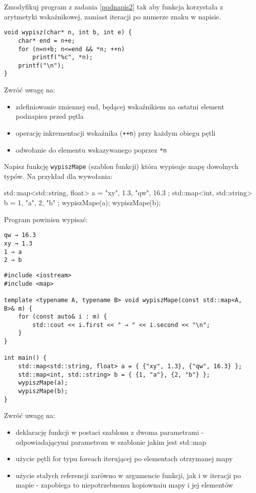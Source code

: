 \dbEntryCheckResults
Zmodyfikuj program z zadania \ref{podnapis2} tak aby funkcja korzystała z arytmetyki wskaźnikowej, zamiast iteracji po numerze znaku w napisie.
\fi

\dbEntryCheckResults
\begin{verbatim}
void wypisz(char* n, int b, int e) {
	char* end = n+e;
	for (n=n+b; n<=end && *n; ++n)
		printf("%c", *n);
	printf("\n");
}
\end{verbatim}

\noindent Zwróć uwagę na:
\begin{itemize}
\item zdefiniowanie zmiennej end, będącej wskaźnikiem na ostatni element podnapisu przed pętla
\item operację inkrementacji wskaźnika (\Verb$++n$) przy każdym obiegu pętli
\item odwołanie do elementu wskazywanego poprzez \Verb$*n$
\end{itemize}
\fi


\dbEntryCheckResults
Napisz funkcję \Verb#wypiszMape# (szablon funkcji) która wypisuje mapę dowolnych typów. Na przykład dla wywołania:
\begin{CodeFrame*}[cpp]{}
std::map<std::string, float> a = { {"xy", 1.3}, {"qw", 16.3} };
std::map<int, std::string> b = { {1, "a"}, {2, "b"} };
wypiszMape(a);
wypiszMape(b);
\end{CodeFrame*}
\vspace{-8pt}Program powinien wypisać:
\vspace{-8pt}\begin{Verbatim}
qw → 16.3
xy → 1.3
1 → a
2 → b
\end{Verbatim}
\fi

\dbEntryCheckResults
\begin{verbatim}
#include <iostream>
#include <map>

template <typename A, typename B> void wypiszMape(const std::map<A, B>& m) {
	for (const auto& i : m) {
		std::cout << i.first << " → " << i.second << "\n";
	}
}

int main() {
	std::map<std::string, float> a = { {"xy", 1.3}, {"qw", 16.3} };
	std::map<int, std::string> b = { {1, "a"}, {2, "b"} };
	wypiszMape(a);
	wypiszMape(b);
}
\end{verbatim}

\noindent Zwróć uwagę na:
\begin{itemize}
\item deklarację funkcji w postaci szablonu z dwoma parametrami - odpowiadającymi parametrom w szablonie jakim jest std::map
\item użycie pętli for typu foreach iterującej po elementach otrzymanej mapy
\item użycie stałych referencji zarówno w argumencie funkcji, jak i w iteracji po mapie - zapobiega to niepotrzebnemu kopiownaiu mapy i jej elementów
\end{itemize}
\fi



